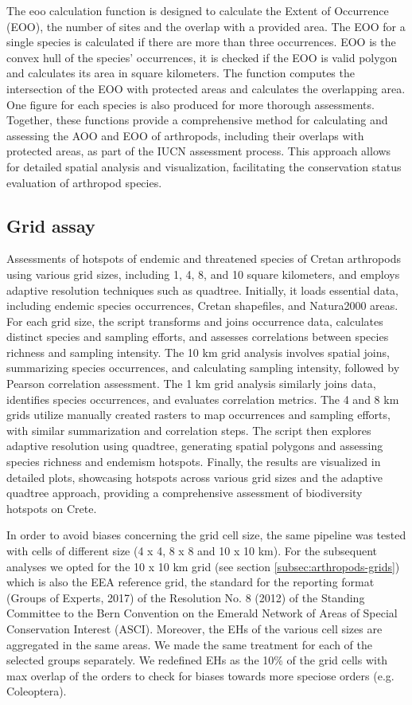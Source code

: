 The eoo calculation function is designed to calculate the Extent of Occurrence (EOO),
the number of sites and the overlap with a provided area.
The EOO for a single species is calculated if there are more than three occurrences.
EOO is the convex hull of the species' occurrences, it is checked if the EOO is valid
polygon and calculates its area in square kilometers. The function computes the intersection of the EOO with protected areas and calculates the overlapping area.
One figure for each species is also produced for more thorough assessments.
Together, these functions provide a comprehensive method for calculating and
assessing the AOO and EOO of arthropods, including their overlaps with protected
areas, as part of the IUCN assessment process. This approach allows for detailed
spatial analysis and visualization, facilitating the conservation status evaluation of arthropod species.


    \subsection{Grid assay}
    \label{subsec:arthropods-ehs-kbas}
Assessments of hotspots of endemic and threatened species of Cretan arthropods
using various grid sizes, including 1, 4, 8, and 10 square kilometers, and
employs adaptive resolution techniques such as quadtree. Initially, it loads
essential data, including endemic species occurrences, Cretan shapefiles, and
Natura2000 areas. For each grid size, the script transforms and joins occurrence
data, calculates distinct species and sampling efforts, and assesses correlations
between species richness and sampling intensity. The 10 km grid analysis involves
spatial joins, summarizing species occurrences, and calculating sampling intensity,
followed by Pearson correlation assessment. The 1 km grid analysis similarly joins data,
identifies species occurrences, and evaluates correlation metrics.
The 4 and 8 km grids utilize manually created rasters to map occurrences and
sampling efforts, with similar summarization and correlation steps. The script
then explores adaptive resolution using quadtree, generating spatial polygons
and assessing species richness and endemism hotspots.
Finally, the results are visualized in detailed plots, showcasing hotspots
across various grid sizes and the adaptive quadtree approach, providing a comprehensive assessment of biodiversity hotspots on Crete.


In order to avoid biases concerning the grid cell size, the same
pipeline was tested with cells of different size (4 x 4, 8 x 8 and 10 x 10 km).
For the subsequent analyses we opted for the 10 x 10 km grid (see section \ref{subsec:arthropods-grids})
which is also the EEA reference grid, the standard for the reporting format
(Groups of Experts, 2017) of the Resolution No. 8 (2012) of the Standing Committee
to the Bern Convention on the Emerald Network of Areas of Special Conservation Interest (ASCI).
Moreover, the EHs of the various cell sizes are aggregated in the same areas.
We made the same treatment for each of the selected groups separately.
We redefined EHs as the 10\% of the grid cells with max overlap of the orders
to check for biases towards more speciose orders (e.g. Coleoptera).

